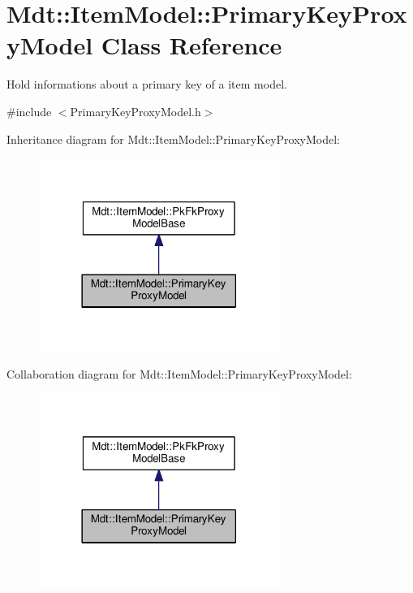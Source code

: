 \hypertarget{class_mdt_1_1_item_model_1_1_primary_key_proxy_model}{}\section{Mdt\+:\+:Item\+Model\+:\+:Primary\+Key\+Proxy\+Model Class Reference}
\label{class_mdt_1_1_item_model_1_1_primary_key_proxy_model}


Hold informations about a primary key of a item model.  




{\ttfamily \#include $<$Primary\+Key\+Proxy\+Model.\+h$>$}



Inheritance diagram for Mdt\+:\+:Item\+Model\+:\+:Primary\+Key\+Proxy\+Model\+:\nopagebreak
\begin{figure}[H]
\begin{center}
\leavevmode
\includegraphics[width=222pt]{class_mdt_1_1_item_model_1_1_primary_key_proxy_model__inherit__graph}
\end{center}
\end{figure}


Collaboration diagram for Mdt\+:\+:Item\+Model\+:\+:Primary\+Key\+Proxy\+Model\+:\nopagebreak
\begin{figure}[H]
\begin{center}
\leavevmode
\includegraphics[width=222pt]{class_mdt_1_1_item_model_1_1_primary_key_proxy_model__coll__graph}
\end{center}
\end{figure}
